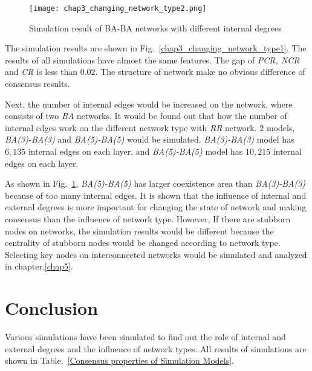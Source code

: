 \begin{figure}[!htb]
	\centering
	\texttt{[image: chap3\_changing\_network\_type2.png]}
	\caption{Simulation result of BA-BA networks with different internal degrees}
	\label{chap3_changing_network_type2}
\end{figure}

The simulation results are shown in Fig.~\ref{chap3_changing_network_type1}. The results of all simulations have almost the same features. The gap of \textit{PCR, NCR} and \textit{CR} is less than $0.02$. The structure of network make no obvious difference of consensus results. 

Next, the number of internal edges would be increased on the network, where consists of two \textit{BA} networks. It would be found out that how the number of internal edges work on the different network type with \textit{RR} network. $2$ models, \textit{BA(3)-BA(3)} and \textit{BA(5)-BA(5)} would be simulated. \textit{BA(3)-BA(3)} model has $6,135$ internal edges on each layer, and \textit{BA(5)-BA(5)} model has $10,215$ internal edges on each layer.

As shown in Fig.~\ref{chap3_changing_network_type2}, \textit{BA(5)-BA(5)} has larger coexistence area than \textit{BA(3)-BA(3)} because of too many internal edges. It is shown that the influence of internal and external degrees is more important for changing the state of network and making consensus than the influence of network type. However, If there are stubborn nodes on networks, the simulation results would be different because the centrality of stubborn nodes would be changed according to network type. Selecting key nodes on interconnected networks would be simulated and analyzed in chapter.\ref{chap5}.\\

\section{Conclusion}
Various simulations have been simulated to find out the role of internal and external degrees and the influence of network types. All results of simulations are shown in Table.~\ref{Consensus properties of Simulation Models}.
 

